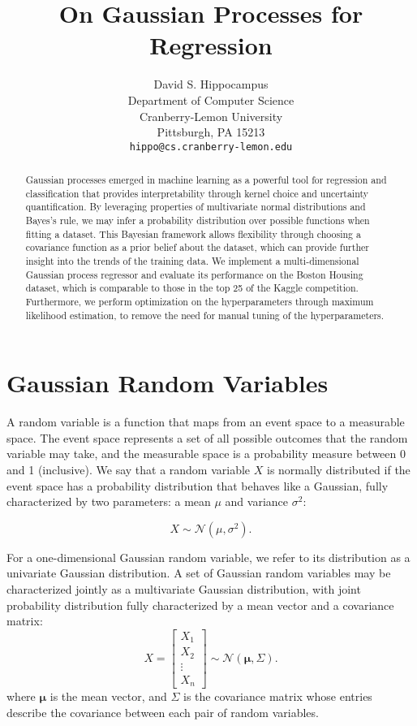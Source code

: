 \documentclass{article}
\title{On Gaussian Processes for Regression}
\author{
  David S. Hippocampus \\
  Department of Computer Science\\
  Cranberry-Lemon University\\
  Pittsburgh, PA 15213 \\
  \texttt{hippo@cs.cranberry-lemon.edu} \\
}
\begin{document}
\maketitle

\begin{abstract}
Gaussian processes emerged in machine learning as a powerful tool for regression and classification that provides interpretability through kernel choice and uncertainty quantification. By leveraging properties of multivariate normal distributions and Bayes’s rule, we may infer a probability distribution over possible functions when fitting a dataset. This Bayesian framework allows flexibility through choosing a covariance function as a prior belief about the dataset, which can provide further insight into the trends of the training data. We implement a multi-dimensional Gaussian process regressor and evaluate its performance on the Boston Housing dataset, which is comparable to those in the top 25 of the Kaggle competition. Furthermore, we perform optimization on the hyperparameters through maximum likelihood estimation, to remove the need for manual tuning of the hyperparameters.
\end{abstract}

\section{Gaussian Random Variables}
A random variable is a function that maps from an event space to a measurable space. The event space represents a set of all possible outcomes that the random variable may take, and the measurable space is a probability measure between 0 and 1 (inclusive). We say that a random variable $X$ is normally distributed if the event space has a probability distribution that behaves like a Gaussian, fully characterized by two parameters: a mean $\mu$ and variance $\sigma^2$:

\[X\sim \mathcal{N}(\mu,\sigma^2).\]

For a one-dimensional Gaussian random variable, we refer to its distribution as a univariate Gaussian distribution. A set of Gaussian random variables may be characterized jointly as a multivariate Gaussian distribution, with joint probability distribution fully characterized by a mean vector and a covariance matrix:
\[X = \begin{bmatrix}
           X_{1} \\
           X_{2} \\
           \vdots \\
           X_{n}
         \end{bmatrix}   \sim \mathcal{N}(\boldsymbol{\mu},\Sigma). \]
where $\boldsymbol{\mu}$ is the mean vector, and $\Sigma$ is the covariance matrix whose entries describe the covariance between each pair of random variables.
\end{document}
